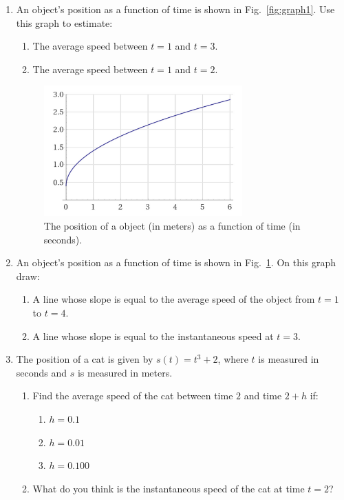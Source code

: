 \documentclass[12pt]{article}
\begin{document}
\begin{enumerate}
\setlength{\itemsep}{8mm}


\item An object's position as a function of time is shown in
  Fig.~\ref{fig:graph1}. Use this graph to estimate:
  \begin{enumerate}
  \item The average speed between $t=1$ and $t=3$.
  \item The average speed between $t=1$ and $t=2$.
\end{enumerate}


\begin{figure}[h]
\begin{center}
\vspace{1mm}
\includegraphics[width=3.0in]{graph_HW04_2.png}
\vspace{-2mm}
\caption{The position of a object (in meters) as a function of time
  (in seconds). }
\label{fig:graph2}
\vspace{-5mm}
\end{center}
\end{figure}

\item An object's position as a function of time is shown in
  Fig.~\ref{fig:graph2}. On this graph draw:
  \begin{enumerate}
    \item A line whose slope is equal to the average speed of the
      object from $t=1$ to $t=4$.
    \item A line whose slope is equal to the instantaneous speed at
      $t=3$.
  \end{enumerate}



\item The position of a cat is given by $s(t) = t^3 + 2$, where $t$
  is measured in seconds and $s$ is measured in meters.
  \begin{enumerate}
  \item Find the average speed of the cat between time $2$ and time
    $2+h$ if: 
  \begin{enumerate}
  \item $h=0.1$
  \item $h=0.01$
  \item $h=0.100$
  \end{enumerate}
  \item What do you think is the instantaneous speed of the cat at
    time $t=2$?
  \end{enumerate}


\end{enumerate}
\end{document}
